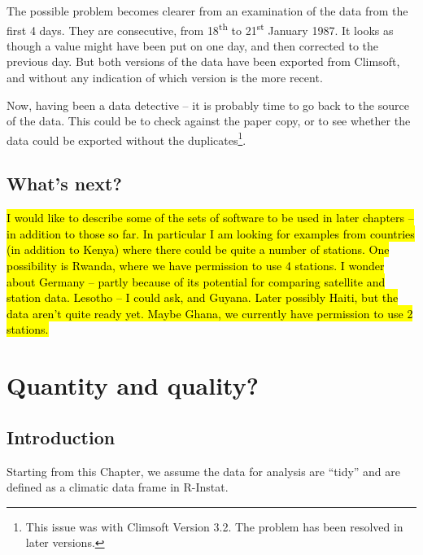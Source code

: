 \documentclass[
  letterpaper,
  DIV=11,
  numbers=noendperiod]{scrreprt}
\begin{document}
The possible problem becomes clearer from an examination of the data
from the first 4 days. They are consecutive, from 18\textsuperscript{th}
to 21\textsuperscript{st} January 1987. It looks as though a value might
have been put on one day, and then corrected to the previous day. But
both versions of the data have been exported from Climsoft, and without
any indication of which version is the more recent.

Now, having been a data detective -- it is probably time to go back to
the source of the data. This could be to check against the paper copy,
or to see whether the data could be exported without the
duplicates\footnote{This issue was with Climsoft Version 3.2. The
  problem has been resolved in later versions.}.

\section{What's next?}\label{whats-next}

\hl{I would like to describe some of the sets of software to be used in
later chapters -- in addition to those so far. In particular I am
looking for examples from countries (in addition to Kenya) where there
could be quite a number of stations. One possibility is Rwanda, where we
have permission to use 4 stations. I wonder about Germany -- partly
because of its potential for comparing satellite and station data.
Lesotho -- I could ask, and Guyana. Later possibly Haiti, but the data
aren't quite ready yet. Maybe Ghana, we currently have permission to use
2 stations.}


\chapter{Quantity and quality?}\label{quantity-and-quality}

\section{Introduction}\label{introduction-3}

Starting from this Chapter, we assume the data for analysis are ``tidy''
and are defined as a climatic data frame in R-Instat.
\end{document}
